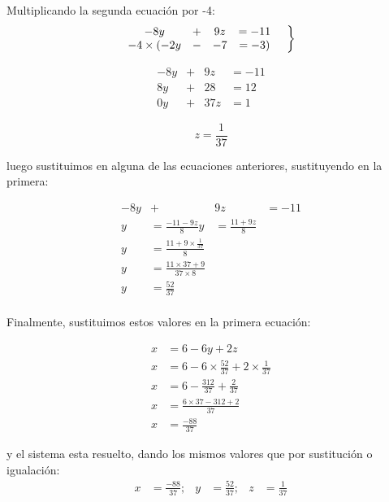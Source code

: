     Multiplicando la segunda ecuación por -4:
    \begin{equation*}
        \left.
        \begin{matrix}
           -8y &+&9z &= -11\\
            -4\times(-2y &-&-7 &= -3)
        \end{matrix}
        \hspace*{0.5cm}\right\rbrace
    \end{equation*}

    \begin{equation*}
        \begin{matrix}
           -8y &+&9z &= -11\\
            8y &+&28 &= 12\\
            \hline
            0y &+&37z &=1
        \end{matrix}
    \end{equation*}


    $$ z = \frac{1}{37}  $$

    luego sustituimos en alguna de las ecuaciones anteriores, sustituyendo en
    la primera:


    \begin{align*}
        -8y &+&9z &= -11\\
        y &= \frac{-11-9z}{8}
        y &= \frac{11+9z}{8} \\
        y &= \frac{11+9\times \frac{1}{37} }{8}\\
        y&= \frac{11\times37+9}{37\times8}  \\
        y&= \frac{52}{37} \\
    \end{align*}

    Finalmente, sustituimos estos valores en la primera ecuación:

    \begin{align*}
        x&= 6-6y+2z	\\
        x &= 6- 6\times \frac{52}{37} + 2\times \frac{1}{37}\\
        x&= 6- \frac{312}{37} + \frac{2}{37} \\
        x &= \frac{6\times37 - 312 + 2}{37}\\
        x &=\frac{-88}{37}
    \end{align*}

    y el sistema esta resuelto, dando los mismos valores que por sustitución o igualación:
    \begin{align*}
        x &=\frac{-88}{37} ;& y&=\frac{52}{37} ;& z&=\frac{1}{37}  		\\
    \end{align*}

